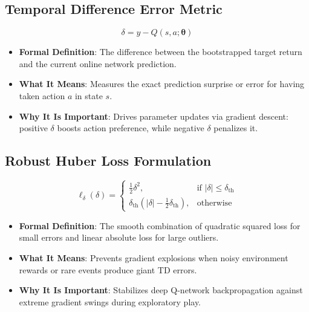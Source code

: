 \documentclass[11pt,a4paper]{article}
\theoremstyle{definition}
\begin{document}
\subsection{Temporal Difference Error Metric}
{\boldmath
\begin{equation}
\delta = y - Q(s, a; \boldsymbol{\theta})
\end{equation}
}
\begin{itemize}
    \item \textbf{Formal Definition}: The difference between the bootstrapped target return and the current online network prediction.
    \item \textbf{What It Means}: Measures the exact prediction surprise or error for having taken action $a$ in state $s$.
    \item \textbf{Why It Is Important}: Drives parameter updates via gradient descent: positive $\delta$ boosts action preference, while negative $\delta$ penalizes it.
\end{itemize}

\subsection{Robust Huber Loss Formulation}
{\boldmath
\begin{equation}
\ell_\delta(\delta) = 
\begin{cases}
\frac{1}{2} \delta^2, & \text{if } |\delta| \le \delta_{\text{th}} \\
\delta_{\text{th}} \left( |\delta| - \frac{1}{2} \delta_{\text{th}} \right), & \text{otherwise}
\end{cases}
\end{equation}
}
\begin{itemize}
    \item \textbf{Formal Definition}: The smooth combination of quadratic squared loss for small errors and linear absolute loss for large outliers.
    \item \textbf{What It Means}: Prevents gradient explosions when noisy environment rewards or rare events produce giant TD errors.
    \item \textbf{Why It Is Important}: Stabilizes deep Q-network backpropagation against extreme gradient swings during exploratory play.
\end{itemize}
\end{document}
